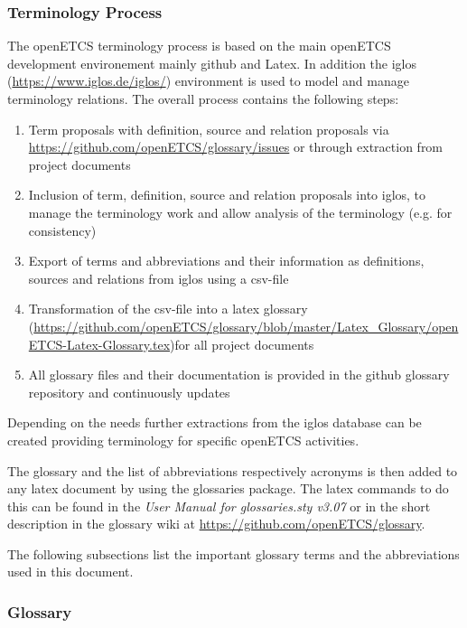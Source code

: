\documentclass{template/openetcs_article}
\begin{document}
\subsubsection{Terminology Process}

The openETCS terminology process is based on the main openETCS development environement mainly github and Latex.  In addition the iglos (\url{https://www.iglos.de/iglos/}) environment is used to model and manage terminology relations. The overall process contains the following steps: 

\begin{enumerate}

\item Term proposals with definition, source and relation proposals via \url{https://github.com/openETCS/glossary/issues} or through extraction from project documents
\item Inclusion of term, definition, source and relation proposals into iglos, to manage the terminology work and allow analysis of the terminology (e.g. for consistency)
\item Export of terms and abbreviations and their information as definitions, sources and relations from iglos using a csv-file
\item Transformation of the csv-file into a latex glossary (\url{https://github.com/openETCS/glossary/blob/master/Latex_Glossary/openETCS-Latex-Glossary.tex})for all project documents
\item All glossary files and their documentation is provided in the github glossary repository and continuously updates 
\end{enumerate}

Depending on the needs further extractions from the iglos database can be created providing terminology for specific openETCS activities.

The glossary and the list of abbreviations respectively acronyms is then added to any latex document by using the glossaries package. The latex commands to do this can be found in the \textit{User Manual for glossaries.sty v3.07} or in the short description in the glossary wiki at \url{https://github.com/openETCS/glossary}.

The following subsections list the important glossary terms and the abbreviations used in this document. 

\subsubsection{Glossary}
\end{document}

